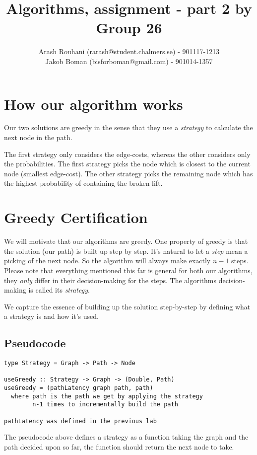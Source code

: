 \documentclass[a4paper,11pt]{article}
\title{Algorithms, assignment - part 2 by Group 26}
\author{Arash Rouhani (rarash@student.chalmers.se) - 901117-1213\\
        Jakob Boman (bisforboman@gmail.com) - 901014-1357}
\begin{document}
\maketitle

\section{How our algorithm works}
Our two solutions are greedy in the sense that they use a \emph{strategy}
to calculate the next node in the path.

The first strategy only considers the edge-costs, whereas the other considers
only the probabilities. The first strategy picks the node which is closest
to the current node (smallest edge-cost). The other strategy picks the
remaining node which has the highest probability of containing the broken lift.


\section{Greedy Certification}

We will motivate that our algorithms are greedy. One property of greedy
is that the solution (our path) is built up step by step. It's natural
to let a \emph{step} mean a picking of the next node. So the algorithm
will always make exactly $n-1$ steps. Please note that everything mentioned
this far is general for both our algorithms, they \emph{only} differ
in their decision-making for the steps. The algorithms decision-making
is called its \emph{strategy}.

We capture the essence of building up the solution step-by-step
by defining what a strategy is and how it's used.

\subsection{Pseudocode}
\begin{lstlisting}[mathescape]
type Strategy = Graph -> Path -> Node

useGreedy :: Strategy -> Graph -> (Double, Path)
useGreedy = (pathLatency graph path, path)
  where path is the path we get by applying the strategy
        n-1 times to incrementally build the path

pathLatency was defined in the previous lab

\end{lstlisting}

The pseudocode above defines a strategy as a function
taking the graph and the path decided upon so far,
the function should return the next node to take.
\end{document}

